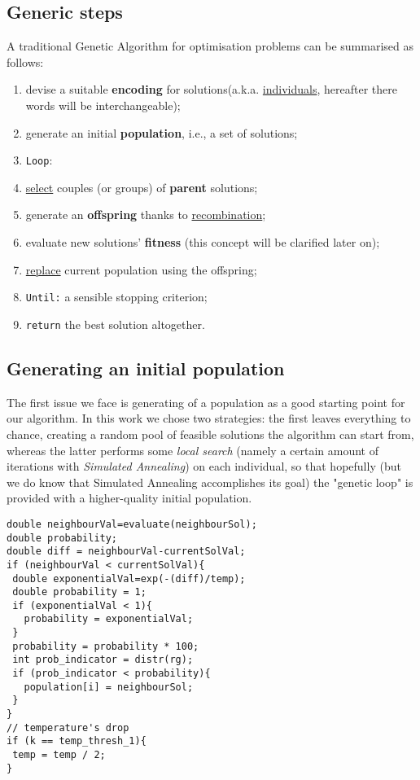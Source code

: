 \documentclass[letterpaper, 10 pt, conference]{ieeeconf}  %
\begin{document}
\subsection{Generic steps} 
A traditional Genetic Algorithm for optimisation problems can be summarised as follows:
\begin{enumerate}
\item devise a suitable \textbf{encoding} for solutions(a.k.a. \underline{individuals}, hereafter there words will be interchangeable);
\item generate an initial \textbf{population}, i.e., a set of solutions;
\item \texttt{Loop}:
\item \hspace*{ 0.2 mm} \underline{select} couples (or groups) of \textbf{parent} solutions;
\item \hspace*{ 0.2 mm} generate an \textbf{offspring} thanks to \underline{recombination};
\item \hspace*{ 0.2 mm} evaluate new solutions' \textbf{fitness} (this concept will be \hspace*{ 0.2 mm} clarified later on);
\item \hspace*{ 0.2 mm} \underline{replace} current population using the offspring;
\item \texttt{Until:} a sensible stopping criterion;
\item \texttt{return} the best solution altogether.
\end{enumerate}

\subsection{Generating an initial population}
The first issue we face is generating of a population as a good starting point for our algorithm. In this work we chose two strategies: the first leaves everything to chance, creating a random pool of feasible solutions the algorithm can start from, whereas the latter performs some \textit{local search} (namely a certain amount of iterations with \textit{Simulated Annealing}) on each individual, so that hopefully (but we do know that Simulated Annealing accomplishes its goal) the "genetic loop" is provided with a higher-quality initial population.  
\begin{lstlisting}[caption={Code within main annealing loop, from \texttt{TSPPopulation.cpp}}]
double neighbourVal=evaluate(neighbourSol);   
double probability;
double diff = neighbourVal-currentSolVal;
if (neighbourVal < currentSolVal){
 double exponentialVal=exp(-(diff)/temp); 
 double probability = 1;
 if (exponentialVal < 1){
   probability = exponentialVal;
 }
 probability = probability * 100;    
 int prob_indicator = distr(rg);		
 if (prob_indicator < probability){   					
   population[i] = neighbourSol;
 }				
}
// temperature's drop
if (k == temp_thresh_1){
 temp = temp / 2;
}
\end{lstlisting}
\end{document}
